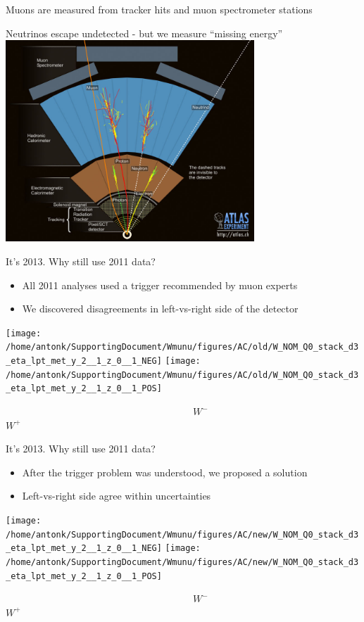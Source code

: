 {
\centering
\iteb
\item Muons are measured from tracker hits and muon spectrometer stations
\item Neutrinos escape undetected - but we measure ``missing energy''
\itee
\includegraphics[width=0.7\textwidth]{dates/mtg/figures/wz/particles}

}



\begin{frame}{It's 2013. Why still use 2011 data?}
\begin{itemize}
\item All 2011 analyses used a trigger recommended by muon experts
\item We discovered disagreements in left-vs-right side of the detector
\end{itemize}

\centering
\texttt{[image: /home/antonk/SupportingDocument/Wmunu/figures/AC/old/W\_NOM\_Q0\_stack\_d3\_eta\_lpt\_met\_y\_2\_\_1\_z\_0\_\_1\_NEG]}
\texttt{[image: /home/antonk/SupportingDocument/Wmunu/figures/AC/old/W\_NOM\_Q0\_stack\_d3\_eta\_lpt\_met\_y\_2\_\_1\_z\_0\_\_1\_POS]}

~~~~~~~~~~~~~~~~~~~~~~~~~~~~~~~~~~~~~~$W^-$~~~~~~~~~~~~~~~~~~~~~~~~~~~~$W^+$
\end{frame}

\begin{frame}{It's 2013. Why still use 2011 data?}
\begin{itemize}
\item After the trigger problem was understood, we proposed a solution
\item Left-vs-right side agree within uncertainties
\end{itemize}

\centering
\texttt{[image: /home/antonk/SupportingDocument/Wmunu/figures/AC/new/W\_NOM\_Q0\_stack\_d3\_eta\_lpt\_met\_y\_2\_\_1\_z\_0\_\_1\_NEG]}
\texttt{[image: /home/antonk/SupportingDocument/Wmunu/figures/AC/new/W\_NOM\_Q0\_stack\_d3\_eta\_lpt\_met\_y\_2\_\_1\_z\_0\_\_1\_POS]}

~~~~~~~~~~~~~~~~~~~~~~~~~~~~~~~~~~~~~~$W^-$~~~~~~~~~~~~~~~~~~~~~~~~~~~~$W^+$
\end{frame}


